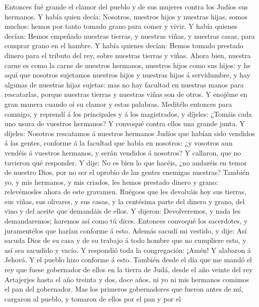  Entonces fué grande el clamor del pueblo y de sus mujeres
contra los Judíos sus hermanos.  Y había quien decía:
Nosotros, nuestros hijos y nuestras hijas, somos muchos: hemos por tanto
tomado grano para comer y vivir.  Y había quienes decían:
Hemos empeñado nuestras tierras, y nuestras viñas, y nuestras casas,
para comprar grano en el hambre.  Y había quienes decían:
Hemos tomado prestado dinero para el tributo del rey, sobre nuestras
tierras y viñas.  Ahora bien, nuestra carne es como la
carne de nuestros hermanos, nuestros hijos como sus hijos: y he aquí que
nosotros sujetamos nuestros hijos y nuestras hijas á servidumbre, y hay
algunas de nuestras hijas sujetas: mas no hay facultad en nuestras manos
para rescatarlas, porque nuestras tierras y nuestras viñas son de otros.
 Y enojéme en gran manera cuando oí su clamor y estas
palabras.  Meditélo entonces para conmigo, y reprendí á
los principales y á los magistrados, y díjeles: ¿Tomáis cada uno usura
de vuestros hermanos? Y convoqué contra ellos una grande junta.
 Y díjeles: Nosotros rescatamos á nuestros hermanos Judíos
que habían sido vendidos á las gentes, conforme á la facultad que había
en nosotros: ¿y vosotros aun vendéis á vuestros hermanos, y serán
vendidos á nosotros? Y callaron, que no tuvieron qué responder.
 Y dije: No es bien lo que hacéis, ¿no andaréis en temor
de nuestro Dios, por no ser el oprobio de las gentes enemigas nuestras?
 También yo, y mis hermanos, y mis criados, les hemos
prestado dinero y grano: relevémosles ahora de este gravamen.
 Ruégoos que les devolváis hoy sus tierras, sus viñas,
sus olivares, y sus casas, y la centésima parte del dinero y grano, del
vino y del aceite que demandáis de ellos.  Y dijeron:
Devolveremos, y nada les demandaremos; haremos así como tú dices.
Entonces convoqué los sacerdotes, y juramentélos que harían conforme á
esto.  Además sacudí mi vestido, y dije: Así sacuda Dios
de su casa y de su trabajo á todo hombre que no cumpliere esto, y así
sea sacudido y vacío. Y respondió toda la congregación: ¡Amén! Y
alabaron á Jehová. Y el pueblo hizo conforme á esto. 
También desde el día que me mandó el rey que fuese gobernador de ellos
en la tierra de Judá, desde el año veinte del rey Artajerjes hasta el
año treinta y dos, doce años, ni yo ni mis hermanos comimos el pan del
gobernador.  Mas los primeros gobernadores que fueron
antes de mí, cargaron al pueblo, y tomaron de ellos por el pan y por el
